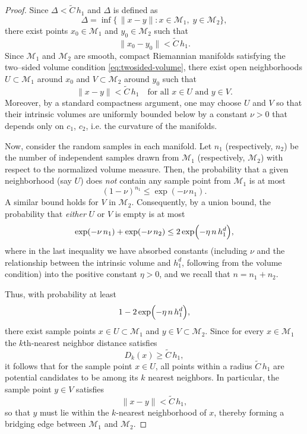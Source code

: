 \documentclass{article}
\theoremstyle{plain}
\theoremstyle{definition}
\theoremstyle{remark}
\begin{document}
\begin{proof}
Since $\Delta < \widetilde{C}\,h_1$ and $\Delta$ is defined as 
\[
\Delta = \inf\{\,\|x-y\| : x\in \mathcal{M}_1,\; y\in \mathcal{M}_2\},
\]
there exist points $x_0\in \mathcal{M}_1$ and $y_0\in \mathcal{M}_2$ such that 
\[
\|x_0-y_0\| < \widetilde{C}\,h_1.
\]
Since $\mathcal{M}_1$ and $\mathcal{M}_2$ are smooth, compact Riemannian manifolds satisfying the two–sided volume condition \eqref{eq:twosided-volume}, there exist open neighborhoods $U\subset \mathcal{M}_1$ around $x_0$ and $V\subset \mathcal{M}_2$ around $y_0$ such that 
\[
\|x-y\| < \widetilde{C}\,h_1 \quad \text{for all } x\in U \text{ and } y\in V.
\]
Moreover, by a standard compactness argument, one may choose $U$ and $V$ so that their intrinsic volumes are uniformly bounded below by a constant $\nu>0$ that depends only on $c_1$, $c_2$, i.e. the curvature of the manifolds.

Now, consider the random samples in each manifold. Let $n_1$ (respectively, $n_2$) be the number of independent samples drawn from $\mathcal{M}_1$ (respectively, $\mathcal{M}_2$) with respect to the normalized volume measure. Then, the probability that a given neighborhood (say $U$) does \emph{not} contain any sample point from $\mathcal{M}_1$ is at most 
\[
(1-\nu)^{n_1} \le \exp(-\nu\,n_1).
\]
A similar bound holds for $V$ in $\mathcal{M}_2$. Consequently, by a union bound, the probability that \emph{either} $U$ or $V$ is empty is at most
\[
\exp(-\nu\,n_1) + \exp(-\nu\,n_2) \le 2\exp\Bigl(-\eta\,n\,h_1^d\Bigr),
\]
where in the last inequality we have absorbed constants (including $\nu$ and the relationship between the intrinsic volume and $h_1^d$, following from the volume condition) into the positive constant $\eta>0$, and we recall that $n=n_1+n_2$. 

Thus, with probability at least 
\[
1-2\exp\Bigl(-\eta\,n\,h_1^d\Bigr),
\]
there exist sample points $x\in U\subset\mathcal{M}_1$ and $y\in V\subset\mathcal{M}_2$. Since for every $x\in \mathcal{M}_1$ the $k$th-nearest neighbor distance satisfies 
\[
D_k(x) \ge \widetilde{C}\,h_1,
\]
it follows that for the sample point $x\in U$, all points within a radius $\widetilde{C}\,h_1$ are potential candidates to be among its $k$ nearest neighbors. In particular, the sample point $y\in V$ satisfies
\[
\|x-y\| < \widetilde{C}\,h_1,
\]
so that $y$ must lie within the $k$-nearest neighborhood of $x$, thereby forming a bridging edge between $\mathcal{M}_1$ and $\mathcal{M}_2$.
\end{proof}
\end{document}
